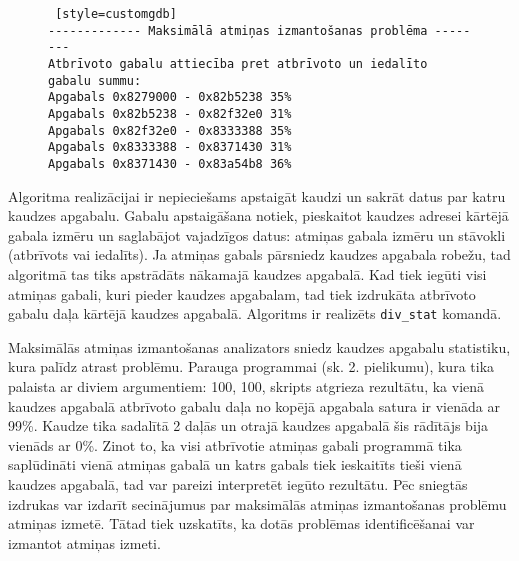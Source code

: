 \begin{figure}[h]
\begin{lstlisting} [style=customgdb]
------------- Maksimālā atmiņas izmantošanas problēma --------
Atbrīvoto gabalu attiecība pret atbrīvoto un iedalīto gabalu summu:
Apgabals 0x8279000 - 0x82b5238 35%
Apgabals 0x82b5238 - 0x82f32e0 31%
Apgabals 0x82f32e0 - 0x8333388 35%
Apgabals 0x8333388 - 0x8371430 31%
Apgabals 0x8371430 - 0x83a54b8 36%
\end{lstlisting}
\caption{\textbf{\fontsize{11}{12}\selectfont {Maksimālās atmiņas izmantošanas rādītājs}}}
\end{figure}

Algoritma realizācijai ir nepieciešams apstaigāt kaudzi un sakrāt datus par katru kaudzes apgabalu.
Gabalu apstaigāšana notiek, pieskaitot kaudzes adresei kārtējā gabala izmēru un saglabājot vajadzīgos datus: atmiņas gabala izmēru un stāvokli (atbrīvots vai iedalīts).
Ja atmiņas gabals pārsniedz kaudzes apgabala robežu, tad algoritmā tas tiks apstrādāts nākamajā kaudzes apgabalā.
Kad tiek iegūti visi atmiņas gabali, kuri pieder kaudzes apgabalam, tad tiek izdrukāta atbrīvoto gabalu daļa kārtējā kaudzes apgabalā.
Algoritms ir realizēts \texttt{div\_stat} komandā.

Maksimālās atmiņas izmantošanas analizators sniedz kaudzes apgabalu statistiku, kura palīdz atrast problēmu.
Parauga programmai (sk. 2. pielikumu), kura tika palaista ar diviem argumentiem: 100, 100, skripts atgrieza rezultātu, ka vienā kaudzes apgabalā atbrīvoto gabalu daļa no kopējā apgabala satura ir vienāda ar 99\%.
Kaudze tika sadalītā 2 daļās un otrajā kaudzes apgabalā šis rādītājs bija vienāds ar 0\%. 
Zinot to, ka visi atbrīvotie atmiņas gabali programmā tika saplūdināti vienā atmiņas gabalā un katrs gabals tiek ieskaitīts tieši vienā kaudzes apgabalā, tad var pareizi interpretēt iegūto rezultātu.
Pēc sniegtās izdrukas var izdarīt secinājumus par maksimālās atmiņas izmantošanas problēmu atmiņas izmetē.
Tātad tiek uzskatīts, ka dotās problēmas identificēšanai var izmantot atmiņas izmeti.

